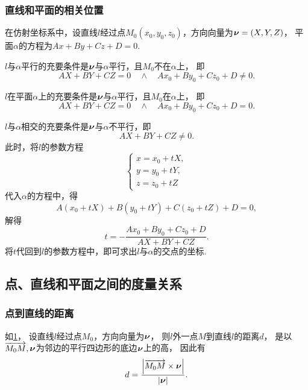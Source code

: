 \subsubsection{直线和平面的相关位置}
在仿射坐标系中，设直线\(l\)经过点\(M_0(x_0,y_0,z_0)\)，方向向量为\(\boldsymbol{\nu}=(X,Y,Z)\)，
平面\(\alpha\)的方程为\(A x + B y + C z + D = 0\).

\(l\)与\(\alpha\)平行的充要条件是\(\boldsymbol{\nu}\)与\(\alpha\)平行，且\(M_0\)不在\(\alpha\)上，
即\[
	AX+BY+CZ=0
	\quad\land\quad
	Ax_0+By_0+Cz_0+D\neq0.
\]

\(l\)在平面\(\alpha\)上的充要条件是\(\boldsymbol{\nu}\)与\(\alpha\)平行，且\(M_0\)在\(\alpha\)上，
即\[
	AX+BY+CZ=0
	\quad\land\quad
	Ax_0+By_0+Cz_0+D=0.
\]

\(l\)与\(\alpha\)相交的充要条件是\(\boldsymbol{\nu}\)与\(\alpha\)不平行，即\[
	AX+BY+CZ\neq0.
\]
此时，将\(l\)的参数方程\[
	\left\{ \begin{array}{l}
		x = x_0 + tX, \\
		y = y_0 + tY, \\
		z = z_0 + tZ
	\end{array} \right.
\]
代入\(\alpha\)的方程中，得\[
	A(x_0+tX) + B(y_0+tY) + C(z_0+tZ) + D = 0,
\]
解得\begin{equation}
	t = - \frac{Ax_0+By_0+Cz_0+D}{AX+BY+CZ}.
\end{equation}
将\(t\)代回到\(l\)的参数方程中，即可求出\(l\)与\(\alpha\)的交点的坐标.

\subsection{点、直线和平面之间的度量关系}

\subsubsection{点到直线的距离}
如\cref{figure:解析几何.点到直线的距离}，
设直线\(l\)经过点\(M_0\)，方向向量为\(\boldsymbol{\nu}\)，
则\(l\)外一点\(M\)到直线\(l\)的距离\(d\)，
是以\(\overrightarrow{M_0 M},\boldsymbol{\nu}\)为邻边的平行四边形的底边\(\boldsymbol{\nu}\)上的高，
因此有\begin{equation}
	d = \frac{\abs{\overrightarrow{M_0 M} \times \boldsymbol{\nu}}}{\abs{\boldsymbol{\nu}}}.
\end{equation}

\begin{figure}[ht]
	\centering
	\caption{}
	\label{figure:解析几何.点到直线的距离}
\end{figure}

